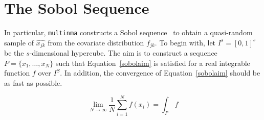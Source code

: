 \section{The Sobol Sequence}
In particular, \verb|multinma| constructs a Sobol sequence~\cite{sobol} to obtain a quasi-random sample of $\hat{x_{jk}}$ from the covariate distribution $f_{jk}$. To begin with, let $I^s = [0,1]^s$ be the $s$-dimensional hypercube. The aim is to construct a sequence $P = \{x_1, \ldots, x_N\}$ such that Equation~\ref{sobolaim} is satisfied for a real integrable function $f$ over $I^S$. In addition, the convergence of Equation~\ref{sobolaim} should be as fast as possible.

\begin{equation}
    \lim_{N \to \infty} \frac{1}{N}\sum_{i = 1}^{N} f(x_i) = \int_{I^s}f
    \label{sobolaim}
\end{equation}

